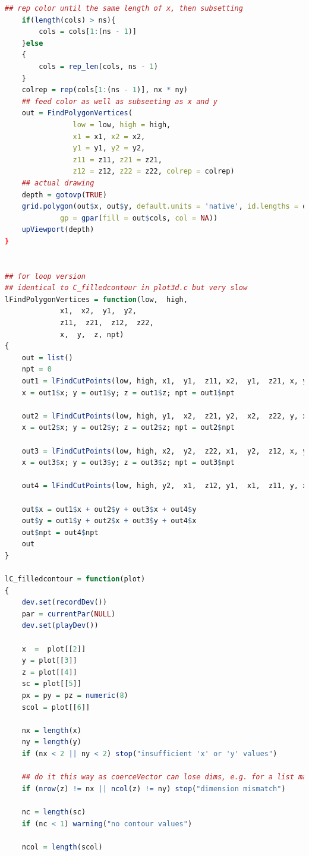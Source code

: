\documentclass{report}
\begin{document}
\begin{lstlisting}[language = R]
    ## rep color until the same length of x, then subsetting 
    if(length(cols) > ns){
        cols = cols[1:(ns - 1)]
    }else
    {
        cols = rep_len(cols, ns - 1)
    }
    colrep = rep(cols[1:(ns - 1)], nx * ny)
    ## feed color as well as subseeting as x and y
    out = FindPolygonVertices(
                low = low, high = high,
                x1 = x1, x2 = x2, 
                y1 = y1, y2 = y2,
                z11 = z11, z21 = z21, 
                z12 = z12, z22 = z22, colrep = colrep)
    ## actual drawing
    depth = gotovp(TRUE)
    grid.polygon(out$x, out$y, default.units = 'native', id.lengths = out$id.length,
             gp = gpar(fill = out$cols, col = NA))
    upViewport(depth)
}


## for loop version
## identical to C_filledcontour in plot3d.c but very slow
lFindPolygonVertices = function(low,  high,
		     x1,  x2,  y1,  y2,
		     z11,  z21,  z12,  z22,
		     x,  y,  z, npt)
{
    out = list()
    npt = 0
    out1 = lFindCutPoints(low, high, x1,  y1,  z11, x2,  y1,  z21, x, y, z, npt)
    x = out1$x; y = out1$y; z = out1$z; npt = out1$npt

    out2 = lFindCutPoints(low, high, y1,  x2,  z21, y2,  x2,  z22, y, x, z, npt)
    x = out2$x; y = out2$y; z = out2$z; npt = out2$npt

    out3 = lFindCutPoints(low, high, x2,  y2,  z22, x1,  y2,  z12, x, y, z, npt)
    x = out3$x; y = out3$y; z = out3$z; npt = out3$npt
            
    out4 = lFindCutPoints(low, high, y2,  x1,  z12, y1,  x1,  z11, y, x, z, npt)

    out$x = out1$x + out2$y + out3$x + out4$y
    out$y = out1$y + out2$x + out3$y + out4$x
    out$npt = out4$npt
    out
}

lC_filledcontour = function(plot)
{
    dev.set(recordDev())
    par = currentPar(NULL)
    dev.set(playDev())

    x  =  plot[[2]]
    y = plot[[3]]
    z = plot[[4]]
    sc = plot[[5]]
    px = py = pz = numeric(8)
    scol = plot[[6]]

    nx = length(x)
    ny = length(y)
    if (nx < 2 || ny < 2) stop("insufficient 'x' or 'y' values")

    ## do it this way as coerceVector can lose dims, e.g. for a list matrix
    if (nrow(z) != nx || ncol(z) != ny) stop("dimension mismatch")

    nc = length(sc)
    if (nc < 1) warning("no contour values")

    ncol = length(scol)
    

\end{lstlisting}
\end{document}
